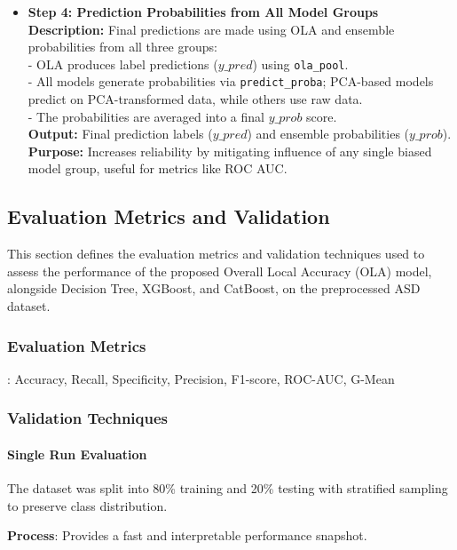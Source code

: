 \documentclass[conference]{IEEEtran}
\begin{document}
\begin{enumerate}
\begin{itemize}
\item \textbf{Step 4: Prediction Probabilities from All Model Groups}~\\
\textbf{Description:} Final predictions are made using OLA and ensemble probabilities from all three groups:\\
- OLA produces label predictions ($y\_pred$) using \texttt{ola\_pool}.\\
- All models generate probabilities via \texttt{predict\_proba}; PCA-based models predict on PCA-transformed data, while others use raw data.\\
- The probabilities are averaged into a final $y\_prob$ score.\\
\textbf{Output:} Final prediction labels ($y\_pred$) and ensemble probabilities ($y\_prob$).\\
\textbf{Purpose:} Increases reliability by mitigating influence of any single biased model group, useful for metrics like ROC AUC.
\end{itemize}
\end{enumerate}

\subsection{Evaluation Metrics and Validation}

This section defines the evaluation metrics and validation techniques used to assess the performance of the proposed Overall Local Accuracy (OLA) model, alongside Decision Tree, XGBoost, and CatBoost, on the preprocessed ASD dataset.

\subsubsection{Evaluation Metrics}: Accuracy, Recall, Specificity, Precision, F1-score, ROC-AUC, G-Mean

\subsubsection{Validation Techniques}

\paragraph{Single Run Evaluation}

The dataset was split into 80\% training and 20\% testing with stratified sampling to preserve class distribution.  

\textbf{Process}: Provides a fast and interpretable performance snapshot.
\end{document}
